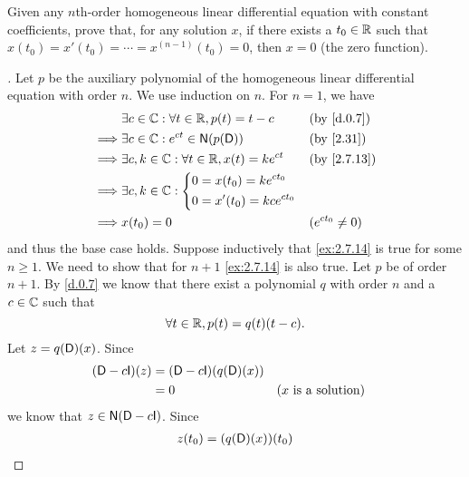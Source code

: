 \begin{ex}\label{ex:2.7.14}
	Given any \(n\)th-order homogeneous linear differential equation with constant coefficients, prove that, for any solution \(x\), if there exists a \(t_0 \in \mathbb{R}\) such that \(x(t_0) = x'(t_0) = \cdots = x^{(n - 1)}(t_0) = 0\), then \(x = 0\) (the zero function).
\end{ex}

\begin{proof}[]
	Let \(p\) be the auxiliary polynomial of the homogeneous linear differential equation with order \(n\).
	We use induction on \(n\).
	For \(n = 1\), we have
	\begin{align*}
		         & \exists c \in \C : \forall t \in \R, p(t) = t - c       &  & \by{d.0.7}         \\
		\implies & \exists c \in \C : e^{ct} \in \ns{p(\Dop)}              &  & \by{2.31}          \\
		\implies & \exists c, k \in \C : \forall t \in \R, x(t) = k e^{ct} &  & \by{2.7.13}        \\
		\implies & \exists c, k \in \C : \begin{dcases}
			                                 0 = x(t_0) = k e^{c t_0} \\
			                                 0 = x'(t_0) = k c e^{c t_0}
		                                 \end{dcases}                                \\
		\implies & x(t_0) = 0                                              &  & (e^{c t_0} \neq 0)
	\end{align*}
	and thus the base case holds.
	Suppose inductively that \cref{ex:2.7.14} is true for some \(n \geq 1\).
	We need to show that for \(n + 1\) \cref{ex:2.7.14} is also true.
	Let \(p\) be of order \(n + 1\).
	By \cref{d.0.7} we know that there exist a polynomial \(q\) with order \(n\) and a \(c \in \mathbb{C}\) such that
	\[
		\forall t \in \mathbb{R}, p(t) = q(t) (t - c).
	\]
	Let \(z = q(\mathsf{D})(x)\).
	Since
	\begin{align*}
		(\Dop - c \IT)(z) & = (\Dop - c \IT)(q(\Dop)(x))                                   \\
		                  & = 0                          &  & \text{(\(x\) is a solution)}
	\end{align*}
	we know that \(z \in \ns{\Dop - c \IT}\).
	Since
	\begin{align*}
		z(t_0) & = (q(\Dop)(x))(t_0)                                                  \\

\end{align*}
\end{proof}
